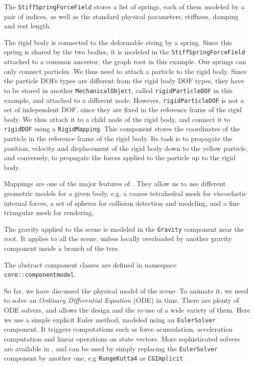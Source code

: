 The \texttt{StiffSpringForceField} stores a list of springs, each of them modeled by a pair of indices, as well as the standard physical parameters, stiffness, damping and rest length.

The rigid body is connected to the deformable string by a spring.
Since this spring is shared by the two bodies, it is modeled in the \texttt{StiffSpringForceField} attached to a common ancestor, the graph root in this example.
Our springs can only connect particles. We thus need to attach a particle to the rigid body. Since the particle DOFs types are different from the rigid body DOF types, they have to be stored in another \texttt{MechanicalObject}, called \texttt{rigidParticleDOF} in this example, and attached to a different node. 
However, \texttt{rigidParticleDOF} is not a set of independent DOF, since they are fixed in the reference frame of the rigid body. We thus attach it to a child node of the rigid body, and connect it to \texttt{rigidDOF} using a \texttt{RigidMapping}. This component stores the coordinates of the particle in the reference frame of the rigid body. Its task is to propagate the position, velocity and displacement of the rigid body down to the yellow particle, and conversely, to propagate the forces applied to the particle up to the rigid body.

Mappings are one of the major features of \sofa. They allow us to use different geometric models for a given body, e.g. a coarse tetrahedral mesh for viscoelastic internal forces, a set of spheres for collision detection and modeling, and a fine triangular mesh for rendering.

The gravity applied to the scene is modeled in the \texttt{Gravity} component near the root. It applies to all the scene, unless locally overloaded by another gravity component inside a branch of the tree.

The abstract component classes are defined in namespace \texttt{core::componentmodel}.

So far, we have discussed the physical model of the scene. 
To animate it, we need to solve an \textit{Ordinary Differential Equation} (ODE) in time. 
There are plenty of ODE solvers, and \sofa allows the design and the re-use of a wide variety of them. 
Here we use a simple explicit Euler method, modeled using an \texttt{EulerSolver} component.
It triggers computations such as force acumulation, acceleration computation and linear operations on state vectors.
More sophisticated solvers are available in \sofa, and can be used by simply replacing the  \texttt{EulerSolver} component by another one, e.g \texttt{RungeKutta4} or \texttt{CGImplicit}.

